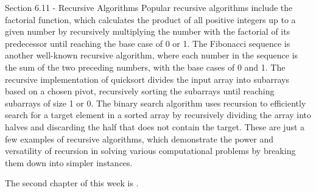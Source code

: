 \begin{notes}{Section 6.11 - Recursive Algorithms}
    Popular recursive algorithms include the factorial function, which calculates the product of all positive integers up to a given number by recursively multiplying the number with the factorial of its predecessor until reaching the base case of 0 or 1. The Fibonacci sequence is another well-known recursive algorithm, where each number in the sequence is the sum of 
    the two preceding numbers, with the base cases of 0 and 1. The recursive implementation of quicksort divides the input array into subarrays based on a chosen pivot, recursively sorting the subarrays until reaching subarrays of size 1 or 0. The binary search algorithm uses recursion to efficiently search for a target element in a sorted array by recursively dividing 
    the array into halves and discarding the half that does not contain the target. These are just a few examples of recursive algorithms, which demonstrate the power and versatility of recursion in solving various computational problems by breaking them down into simpler instances.
\end{notes}

The second chapter of this week is .

